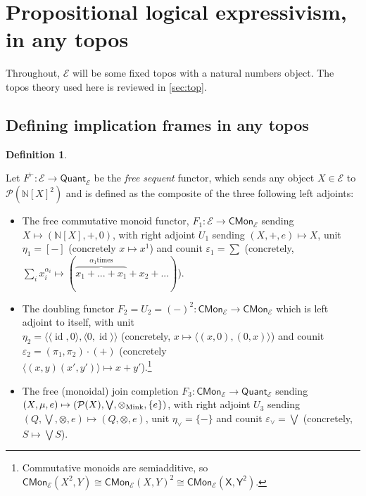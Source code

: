 \documentclass{article}
\theoremstyle{definition}
\newtheorem{definition}{Definition}[section]
\newcommand{\N}{\mathbb{N}}
\newcommand{\cE}{\mathcal{E}}
\newcommand{\cP}{\mathcal{P}}
\newcommand{\cat}[1]{\mathsf{#1}}
\newcommand{\id}{\operatorname{id}}
\begin{document}
\section{Propositional logical expressivism, in any topos}
\label{sec:topx}

Throughout, $\cE$ will be some fixed topos with a natural numbers object. The topos theory used here is reviewed in \cref{sec:top}.

\subsection{Defining implication frames in any topos}


\begin{definition}
    \label{def:freeseq}
    
Let $F^\vdash: \cE \to \cat{Quant}_\cE$ be the {\it free sequent} functor, which sends any object $X \in \cE$ to $\cP(\N[X]^2)$ and is defined as the composite of the three following left adjoints: 

\begin{itemize}
    \item The free commutative monoid functor, $F_1\colon \cE\to \cat{CMon}_\cE$ sending $X \mapsto (\N[X],+,0)$, with right adjoint $U_1$ sending $(X,+,e)\mapsto X$, unit $\eta_1= [-]$ (concretely $x\mapsto x^1$) and counit $\varepsilon_1= \sum$ (concretely, $\sum_i x_i^{\alpha_i}\mapsto (\overset{\alpha_1\text{times}}{\overbrace{x_1+...+x_1}} + x_2 + ...)$).
    \item The doubling functor $F_2=U_2=(-)^2\colon \cat{CMon_\cE}\to \cat{CMon_\cE}$ which is left adjoint to itself, with unit \\$\eta_2= \langle \langle \id, 0\rangle,\langle 0,\id\rangle\rangle$ (concretely, $x\mapsto \langle (x,0),(0,x)\rangle$) and counit $\varepsilon_2=(\pi_1,\pi_2)\cdot (+)$ (concretely \\$\langle (x,y)(x',y')\rangle \mapsto x+y'$).\footnote{Commutative monoids are semiadditive, so $\cat{CMon}_\cE(X^2,Y)\cong \cat{CMon}_\cE(X,Y)^2 \cong \cat{CMon_\cE(X,Y^2)}$.}
    
    \item The free (monoidal) join completion $F_3\colon \cat{CMon_\cE\to Quant_\cE}$ sending $(X,\mu,e)\mapsto (\cP(X),\bigvee, \otimes_{\rm Mink},\{e\})$, with right adjoint  $U_3$ sending $(Q,\bigvee,\otimes,e)\mapsto(Q,\otimes,e)$, unit $\eta_\vee =\{-\}$  and counit $\varepsilon_\vee=\bigvee$ (concretely, $S\mapsto \bigvee S$).
    
\end{itemize}

\end{definition}
\end{document}
